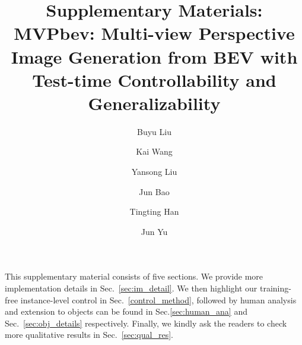 \documentclass[sigconf]{acmart}
\begin{document}
\title{Supplementary Materials: \\ MVPbev: Multi-view Perspective Image Generation from BEV with Test-time Controllability and Generalizability}


\author{Buyu Liu}
\author{Kai Wang}\authornotemark[1]
\author{Yansong Liu}
\author{Jun Bao}
\author{Tingting Han}
\author{Jun Yu}

\maketitle

This supplementary material consists of five sections. We provide more implementation details in Sec.~\ref{sec:im_detail}. 
We then highlight our training-free instance-level control in Sec.~\ref{control_method}, followed by human analysis and extension to objects can be found in Sec.\ref{sec:human_ana} and Sec.~\ref{sec:obj_details} respectively. Finally, we kindly ask the readers to check more qualitative results in Sec.~\ref{sec:qual_res}.
\end{document}
